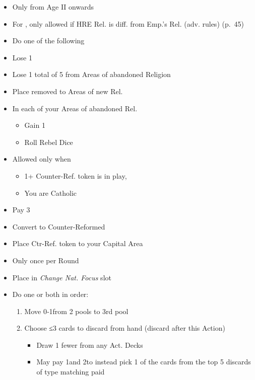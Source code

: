 \documentclass[10pt]{article}
\begin{document}
\begin{itemize}
	\item Only from Age II onwards
	\item For , only allowed if HRE Rel. is diff. from Emp.'s Rel. (adv. rules) (p.~45)
	\item Do one of the following
\end{itemize}
\begin{itemize}
	\item Lose   1\stability
	\item Lose 1 \marriage {} total of 5 \influence from Areas of abandoned Religion
	\item Place removed \influence to Areas of new Rel.
	\item In each of your Areas of abandoned Rel.
	\begin{itemize}
		\item Gain 1 \unrest
		\item Roll Rebel Dice
	\end{itemize}
\end{itemize}
\begin{itemize}
	\item Allowed only when
	\begin{itemize}
		\item 1+ Counter-Ref. token is in play, 
		\item You are Catholic
	\end{itemize}
	\item Pay 3\adminpower
	\item Convert to Counter-Reformed
	\item Place Ctr-Ref. token to your Capital Area
\end{itemize}

\begin{itemize}
	\item Only once per Round
	\item Place \cube in \emph{Change Nat. Focus} slot
	\item Do one or both in order:
	\begin{enumerate}
		\item Move 0‑1\monarchpower from 2 pools to 3rd pool
		\item Choose ≤3 cards to discard from hand (discard after this Action)
		\begin{itemize}
			\item Draw 1 fewer from any Act. Decks
			\item May pay 1\monarchpower and 2\ducats to instead pick 1 of the cards from the top 5 discards of type matching paid \monarchpower
		\end{itemize}
	\end{enumerate}
\end{itemize}
\end{document}
